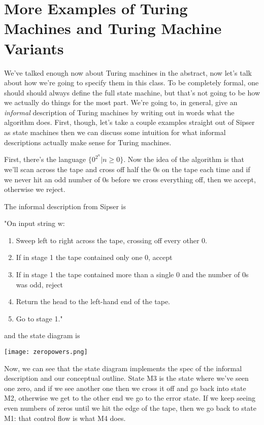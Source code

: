 \documentclass[11pt]{article}
\begin{document}
\section{More Examples of Turing Machines and Turing Machine Variants}
\label{sec-12}
We've talked enough now about Turing machines in the abstract, now let's talk about how we're going to specify them in this class. To be completely formal, one should should always define the full state machine, but that's not going to be how we actually do things for the most part. We're going to, in general, give an \emph{informal} description of Turing machines by writing out in words what the algorithm does. First, though, let's take a couple examples straight out of Sipser as state machines then we can discuss some intuition for what informal descriptions actually make sense for Turing machines. 

First, there's the language $\{0^{2^n} | n \ge 0\}$. Now the idea of the algorithm is that we'll scan across the tape and cross off half the 0s on the tape each time and if we never hit an odd number of 0s before we cross everything off, then we accept, otherwise we reject.

The informal description from Sipser is

"On input string w: 
\begin{enumerate}
\item Sweep left to right across the tape, crossing off every other 0.
\item If in stage 1 the tape contained only one 0, accept
\item If in stage 1 the tape contained more than a single 0 and the number of 0s was odd, reject
\item Return the head to the left-hand end of the tape.
\item Go to stage 1."
\end{enumerate}

and the state diagram is 

\texttt{[image: zeropowers.png]}


Now, we can see that the state diagram implements the spec of the informal description and our conceptual outline. State M3 is the state where we've seen one zero, and if we see another one then we cross it off and go back into state M2, otherwise we get to the other end we go to the error state. If we keep seeing even numbers of zeros until we hit the edge of the tape, then we go back to state M1: that control flow is what M4 does.
\end{document}
